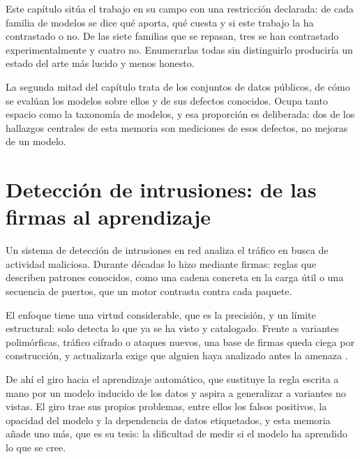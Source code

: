 %

Este capítulo sitúa el trabajo en su campo con una restricción declarada: de cada
familia de modelos se dice qué aporta, qué cuesta y si este trabajo la ha
contrastado o no. De las siete familias que se repasan, tres se han contrastado
experimentalmente y cuatro no. Enumerarlas todas sin distinguirlo produciría un
estado del arte más lucido y menos honesto.

La segunda mitad del capítulo trata de los conjuntos de datos públicos, de cómo
se evalúan los modelos sobre ellos y de sus defectos conocidos. Ocupa tanto
espacio como la taxonomía de modelos, y esa proporción es deliberada: dos de los
hallazgos centrales de esta memoria son mediciones de esos defectos, no mejoras
de un modelo.

\section{Detección de intrusiones: de las firmas al aprendizaje}
\label{sec:sota-contexto}

Un sistema de detección de intrusiones en red analiza el tráfico en busca de
actividad maliciosa. Durante décadas lo hizo mediante firmas: reglas que
describen patrones conocidos, como una cadena concreta en la carga útil o una
secuencia de puertos, que un motor contrasta contra cada paquete.

El enfoque tiene una virtud considerable, que es la precisión, y un límite
estructural: solo detecta lo que ya se ha visto y catalogado. Frente a variantes
polimórficas, tráfico cifrado o ataques nuevos, una base de firmas queda ciega
por construcción, y actualizarla exige que alguien haya analizado antes la
amenaza \cite{Swarnkar2023}.

De ahí el giro hacia el aprendizaje automático, que sustituye la regla escrita a
mano por un modelo inducido de los datos y aspira a generalizar a variantes no
vistas. El giro trae sus propios problemas, entre ellos los falsos positivos, la
opacidad del modelo y la dependencia de datos etiquetados, y esta memoria añade
uno más, que es su tesis: la dificultad de medir si el modelo ha aprendido lo
que se cree.

